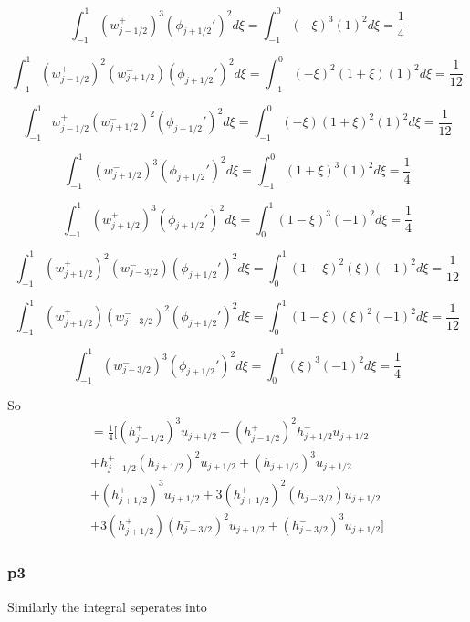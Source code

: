 \documentclass[12pt]{article}
\begin{document}
\[\int_{-1}^{1}\left(w^+_{j - 1/2}\right)^3\left(\phi_{j+1/2}'\right)^2 d\xi = \int_{-1}^{0}\left(-\xi\right)^3\left(1\right)^2 d\xi = \frac{1}{4}\]

\[\int_{-1}^{1} \left(w^+_{j - 1/2}\right)^2\left(w^-_{j + 1/2}\right)\left(\phi_{j+1/2}'\right)^2 d\xi = \int_{-1}^{0} \left(-\xi\right)^2\left(1 + \xi\right)\left(1\right)^2 d\xi = \frac{1}{12}\]

\[\int_{-1}^{1}w^+_{j - 1/2}\left(w^-_{j + 1/2}\right)^2 \left(\phi_{j+1/2}'\right)^2 d\xi = \int_{-1}^{0}(-\xi)\left(1 + \xi\right)^2 \left(1\right)^2 d\xi = \frac{1}{12}\]

\[\int_{-1}^{1} \left(w^-_{j +1/2}\right)^3\left(\phi_{j+1/2}'\right)^2 d\xi  = \int_{-1}^{0} \left(1 + \xi\right)^3\left(1\right)^2 d\xi = \frac{1}{4} \]

\[\int_{-1}^{1} \left(w^+_{j +1/2}\right)^3\left(\phi_{j+1/2}'\right)^2 d\xi = \int_{0}^{1} \left(1 - \xi \right)^3\left(-1\right)^2 d\xi = \frac{1}{4}\]

\[\int_{-1}^{1} \left(w^+_{j + 1/2}\right)^2\left(w^-_{j - 3/2}\right)\left(\phi_{j+1/2}'\right)^2 d\xi = \int_{0}^{1} \left(1 - \xi\right)^2\left(\xi\right)\left(-1\right)^2 d\xi = \frac{1}{12}\]

\[\int_{-1}^{1}\left(w^+_{j + 1/2}\right) \left(w^-_{j - 3/2}\right)^2\left(\phi_{j+1/2}'\right)^2 d\xi=\int_{0}^{1}\left(1 - \xi\right) \left(\xi\right)^2\left(-1\right)^2 d\xi= \frac{1}{12}\]

\[\int_{-1}^{1}\left(w^-_{j - 3/2}\right)^3  \left(\phi_{j+1/2}'\right)^2  d\xi = \int_{0}^{1}\left(\xi\right)^3  \left(-1\right)^2  d\xi= \frac{1}{4}\]

So 
\begin{multline}
 = \frac{1}{4} \bigg[\left(h^+_{j- 1/2}\right)^3u_{j+1/2}  + \left(h^+_{j- 1/2}\right)^2h^-_{j+ 1/2} u_{j+1/2}  \\ + h^+_{j- 1/2}\left(h^-_{j+ 1/2}\right)^2 u_{j+1/2} + \left(h^-_{j+ 1/2}\right)^3  u_{j+1/2} \\ +\left(h^+_{j+ 1/2}\right)^3u_{j+1/2} + 3\left(h^+_{j+ 1/2}\right)^2\left(h^-_{j- 3/2}\right)u_{j+1/2} \\ + 3\left(h^+_{j+ 1/2}\right) \left(h^-_{j- 3/2}\right)^2u_{j+1/2}  +\left(h^-_{j- 3/2}\right)^3  u_{j+1/2}  \bigg]
\end{multline}

\subsubsection{p3}
Similarly the integral seperates into
\end{document}
